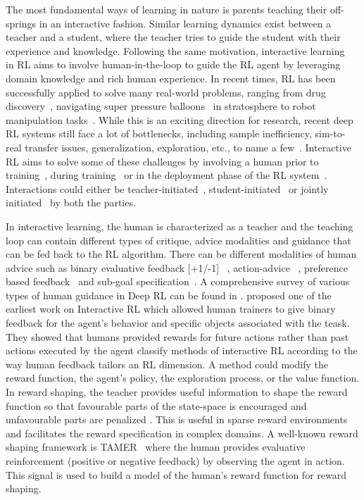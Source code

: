 \documentclass[twoside,11pt]{article}
\begin{document}
The most fundamental ways of learning in nature is parents teaching their off-springs in an interactive fashion. Similar learning dynamics exist between a teacher and a student, where the teacher tries to guide the student with their experience and knowledge. Following the same motivation, interactive learning~\citep{Arzate:2020:SurveyInteractiveRL} in RL aims to involve human-in-the-loop to guide the RL agent by leveraging domain knowledge and rich human experience. In recent times,  RL has been successfully applied to solve many real-world problems, ranging from drug discovery~\citep{popova2018deep}, navigating super pressure balloons~\citep{bellemare2020autonomous} in stratosphere to robot manipulation tasks~\citep{nguyen2019review}. While this is an exciting direction for research, recent deep RL systems still face a lot of bottlenecks, including sample inefficiency, sim-to-real transfer issues, generalization, exploration, etc., to name a few~\citep{ibarz2021train}. Interactive RL aims to solve some of these challenges by involving a human prior to training~\citep{Guo:2022:RLSurveyHumanPriorKnowledge}, during training~\citep{Knox:2008:TAMER} or in the deployment phase of the RL system~\citep{guo2021edge}. Interactions could either be teacher-initiated~\citep{torrey2013teaching}, student-initiated~\citep{da2020uncertainty,MandelEtAl:2017ActionsInHITL} or jointly initiated~\citep{amir2016interactive} by both the parties.

In interactive learning, the human is characterized as a teacher and the teaching loop can contain different types of critique, advice modalities and guidance that can be fed back to the RL algorithm. There can be different modalities of human advice such as binary evaluative feedback [+1/-1] ~\citep{Knox:2008:TAMER}, action-advice~\citep{torrey2013teaching} , preference based feedback~\citep{Christiano:2017:DeepRLHumanPreferences,LeeSmithAbbeel:2021:FeedbackPreferenceHITLLearningPEBBLE} and sub-goal specification~\citep{le2018hierarchical}. A comprehensive survey of various types of human guidance in Deep RL can be found in \cite{zhang2019leveraging}. \cite{Thomaz:2006:RLWithHumanTeachers} proposed one of the earliest work on Interactive RL which allowed human trainers to give binary feedback for the agent's behavior and specific objects associated with the teask. They showed that humans provided rewards for future actions rather than past actions executed by the agent \cite{Arzate:2020:SurveyInteractiveRL} classify methods of interactive RL according to the way human feedback tailors an RL dimension. A method could modify the reward function, the agent's policy, the exploration process, or the value function.  In reward shaping, the teacher provides useful information to shape the reward function so that favourable parts of the state-space is encouraged and unfavourable parts are penalized \citep{ng:99}. This is useful in sparse reward environments and facilitates the reward specification in complex domains. A well-known reward shaping framework is TAMER~\citep{Knox:2008:TAMER, knox:13} where the human provides evaluative reinforcement (positive or negative feedback) by observing the agent in action. This signal is used to build a model of the human's reward function for reward shaping. 
\end{document}
